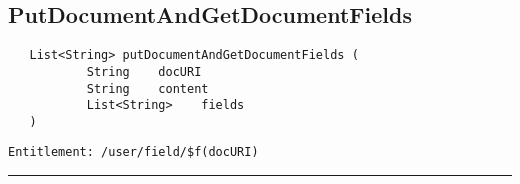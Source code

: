 \subsection{PutDocumentAndGetDocumentFields}
\label{Api:PutDocumentAndGetDocumentFields}
\begin{Verbatim}
   List<String> putDocumentAndGetDocumentFields (
           String    docURI
           String    content
           List<String>    fields
   )
\end{Verbatim}
\begin{Verbatim}[formatcom=\color{Maroon}]
  Entitlement: /user/field/$f(docURI)
\end{Verbatim}



\rule{12cm}{2pt}
